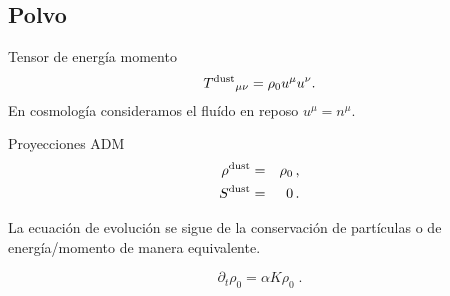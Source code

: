 \documentclass[12pt,fleqn,b5paper]{article}
\begin{document}
\subsection{Polvo}

Tensor de energía momento
\begin{equation}
  {T^{\rm dust}}_{\mu\nu} =  \rho_0 u^\mu u^\nu .
\end{equation}
En cosmología consideramos el fluído en reposo $u^\mu=n^\mu$.

Proyecciones ADM
\begin{eqnarray}
  \label{eq:dustTmunu}
  \rho^{\rm dust} &=&  \rho_0 \,,\\
  S^{\rm dust} &=&  0\,.
\end{eqnarray}

La ecuación de evolución se sigue de la conservación de partículas o
de energía/momento de manera equivalente.

\begin{equation}
  \partial_t \rho_0 = \alpha K \rho_0\;. 
\end{equation}
\end{document}
